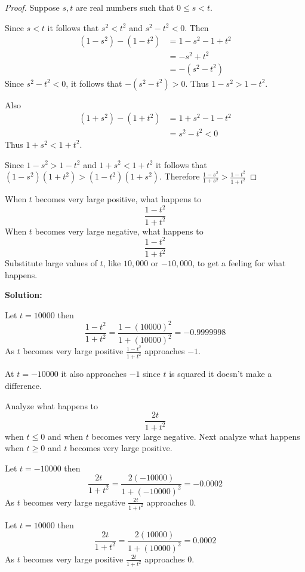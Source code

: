 \begin{proof}
    Suppose $s, t$ are real numbers such that $0 \le s < t$.

    Since $s < t$ it follows that $s^2 < t^2$ and $s^2 - t^2 < 0$.
    Then 
    \begin{align*}
        (1 - s^2) - (1 - t^2) 
            &= 1 - s^2 - 1 + t^2 \\
            &= -s^2 + t^2 \\
            &= -(s^2 - t^2)
    \end{align*}
    Since $s^2 - t^2 < 0$, it follows that $-(s^2 - t^2) > 0$.
    Thus $1 - s^2 > 1 - t^2$.

    Also
    \begin{align*}
        (1 + s^2) - (1 + t^2) 
            &= 1 + s^2 - 1 - t^2 \\
            &= s^2 - t^2 < 0
    \end{align*}
    Thus $1 + s^2 < 1 + t^2$.
    
    Since $1 - s^2 > 1 - t^2$ and $1 + s^2 < 1 + t^2$ 
        it follows that $(1 - s^2)(1 + t^2) > (1 - t^2)(1 + s^2)$.
    Therefore $\frac{1 - s^2}{1 + s^2} > \frac{1 - t^2}{1 + t^2}$
\end{proof}

\begin{tcolorbox}[title=Problem 4, breakable]
    When $t$ becomes very large positive, what happens to 
    \[\frac{1 - t^2}{1 + t^2}\]
    When $t$ becomes very large negative, what happens to 
    \[\frac{1 - t^2}{1 + t^2}\]
    Substitute large values of $t$, like $10,000$ or $-10,000$, to get 
    a feeling for what happens.
\end{tcolorbox}

\textbf{Solution:}

Let $t = 10000$ then
\[\frac{1 - t^2}{1 + t^2} = \frac{1 - (10000)^2}{1 + (10000)^2} = -0.9999998\]
As $t$ becomes very large positive $\frac{1 - t^2}{1 + t^2}$ approaches $-1$.

At $t = -10000$ it also approaches $-1$ since $t$ is squared it doesn't make a difference.

\begin{tcolorbox}[title=Problem 5, breakable]
    Analyze what happens to 
    \[\frac{2t}{1 + t^2}\]
    when $t \le 0$ and when $t$ becomes very large negative.
    Next analyze what happens when $t \ge 0$ and $t$ becomes 
    very large positive.
\end{tcolorbox}

Let $t = -10000$ then
\[\frac{2t}{1 + t^2} = \frac{2(-10000)}{1 + (-10000)^2} = −0.0002\]
As $t$ becomes very large negative $\frac{2t}{1 + t^2}$ approaches $0$.

Let $t = 10000$ then
\[\frac{2t}{1 + t^2} = \frac{2(10000)}{1 + (10000)^2} = 0.0002\]
As $t$ becomes very large positive $\frac{2t}{1 + t^2}$ approaches $0$.